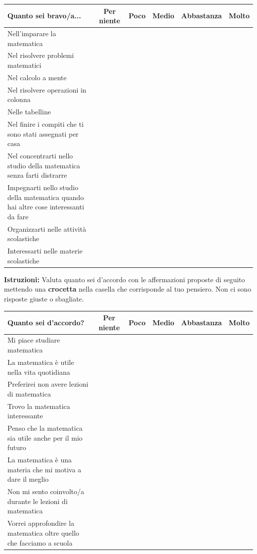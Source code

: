 \noindent
\begin{tabularx}{\textwidth}{|X|c|c|c|c|c|}
  \hline
  \textbf{Quanto sei bravo/a...} & \textbf{\scriptsize Per niente} & \textbf{\scriptsize Poco} & \textbf{\scriptsize Medio} & \textbf{\scriptsize Abbastanza} & \textbf{\scriptsize Molto} \\
  \hline
  Nell'imparare la matematica & & & & & \\
  \hline
  Nel risolvere problemi matematici & & & & & \\
  \hline
  Nel calcolo a mente & & & & & \\
  \hline
  Nel risolvere operazioni in colonna & & & & & \\
  \hline
  Nelle tabelline & & & & & \\
  \hline
  Nel finire i compiti che ti sono stati assegnati per casa & & & & & \\
  \hline 
  Nel concentrarti nello studio della matematica senza farti distrarre & & & & & \\
  \hline
  Impegnarti nello studio della matematica quando hai altre cose interessanti da fare & & & & & \\
  \hline
  Organizzarti nelle attività scolastiche & & & & & \\
  \hline
  Interessarti nelle materie scolastiche & & & & & \\
  \hline
\end{tabularx}

\newpage


\noindent\textbf{Istruzioni:} Valuta quanto sei d'accordo con le affermazioni proposte di seguito mettendo una \textbf{crocetta} nella casella che corrisponde al tuo pensiero. Non ci sono risposte giuste o sbagliate.
\newline

\noindent
\begin{tabularx}{\textwidth}{|X|c|c|c|c|c|}
  \hline
  \textbf{Quanto sei d'accordo?} & \textbf{\scriptsize Per niente} & \textbf{\scriptsize Poco} & \textbf{\scriptsize Medio} & \textbf{\scriptsize Abbastanza} & \textbf{\scriptsize Molto} \\
  \hline
  Mi piace studiare matematica & & & & & \\
  \hline
  La matematica è utile nella vita quotidiana & & & & & \\
  \hline
  Preferirei non avere lezioni di matematica & & & & & \\
  \hline
  Trovo la matematica interessante & & & & & \\
  \hline
  Penso che la matematica sia utile anche per il mio futuro & & & & & \\
  \hline
  La matematica è una materia che mi motiva a dare il meglio & & & & & \\
  \hline 
  Non mi sento coinvolto/a durante le lezioni di matematica & & & & & \\
  \hline
  Vorrei approfondire la matematica oltre quello che facciamo a scuola & & & & & \\
  \hline
\end{tabularx}

